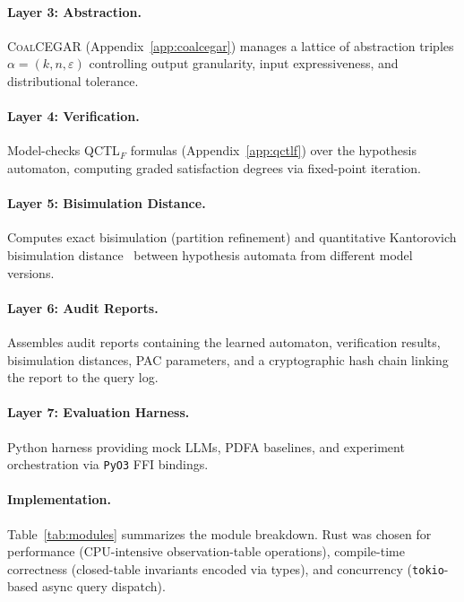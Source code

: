 \documentclass[11pt]{article}
\newcommand{\coalcegar}{\textsc{CoalCEGAR}}
\newcommand{\qctlf}{QCTL$_F$}
\begin{document}
\paragraph{Layer 3: Abstraction.}
\coalcegar{} (Appendix~\ref{app:coalcegar}) manages a lattice of
abstraction triples $\alpha = (k, n, \varepsilon)$ controlling output
granularity, input expressiveness, and distributional tolerance.

\paragraph{Layer 4: Verification.}
Model-checks \qctlf{} formulas (Appendix~\ref{app:qctlf}) over the
hypothesis automaton, computing graded satisfaction degrees via
fixed-point iteration.

\paragraph{Layer 5: Bisimulation Distance.}
Computes exact bisimulation (partition refinement) and quantitative
Kantorovich bisimulation distance~\cite{baldan2018coalgebraic} between
hypothesis automata from different model versions.

\paragraph{Layer 6: Audit Reports.}
Assembles audit reports containing the learned automaton, verification
results, bisimulation distances, PAC parameters, and a cryptographic
hash chain linking the report to the query log.

\paragraph{Layer 7: Evaluation Harness.}
Python harness providing mock LLMs, PDFA baselines, and experiment
orchestration via \texttt{PyO3} FFI bindings.

\paragraph{Implementation.}
Table~\ref{tab:modules} summarizes the module breakdown.  Rust was
chosen for performance (CPU-intensive observation-table operations),
compile-time correctness (closed-table invariants encoded via types),
and concurrency (\texttt{tokio}-based async query dispatch).
\end{document}
